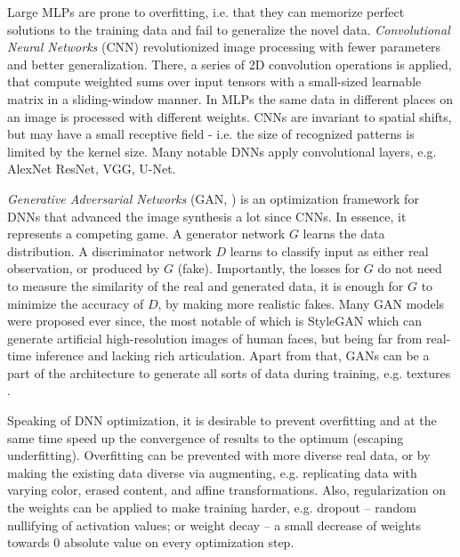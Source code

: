 Large MLPs are prone to overfitting, i.e. that they can memorize perfect solutions to the training data and fail to generalize the novel data. \textit{Convolutional Neural Networks} (CNN) revolutionized \cite{aux:cnn98, dnn:alexnet12} image processing with fewer parameters and better generalization. There, a series of 2D convolution operations is applied, that compute weighted sums over input tensors with a small-sized learnable matrix in a sliding-window manner. In MLPs the same data in different places on an image is processed with different weights. CNNs are invariant to spatial shifts, but may have a small receptive field - i.e. the size of recognized patterns is limited by the kernel size. Many notable DNNs apply convolutional layers, e.g. AlexNet\cite{dnn:alexnet12} ResNet\cite{dnn:resnet16}, VGG\cite{dnn:vgg14}, U-Net\cite{dnn:unet15}.

\textit{Generative Adversarial Networks} (GAN,  \cite{dnn:gan14}) is an optimization framework for DNNs that advanced the image synthesis a lot since CNNs. In essence, it represents a competing game. A generator network $G$ learns the data distribution. A discriminator network $D$ learns to classify input as either real observation, or produced by $G$ (fake). Importantly, the losses for $G$ do not need to measure the similarity of the real and generated data, it is enough for $G$ to minimize the accuracy of $D$, by making more realistic fakes. Many GAN models were proposed \cite{survey:gans:18} ever since, the most notable of which is StyleGAN \cite{dnn:stylegan-v1-19,dnn:stylegan-v2-20,dnn:stylegan-v3-21} which can generate artificial high-resolution images of human faces, but being far from real-time inference and lacking rich articulation. Apart from that, GANs can be a part of the architecture to generate all sorts of data during training, e.g. textures \cite{dnn:stylepeople21, dnn:hyperstyle21}.

Speaking of DNN optimization, it is desirable to prevent overfitting and at the same time speed up the convergence of results to the optimum (escaping underfitting). Overfitting can be prevented with more diverse real data, or by making the existing data diverse via augmenting, e.g. replicating data with varying color, erased content, and affine transformations. Also, regularization on the weights can be applied to make training harder, e.g. dropout\cite{aux:dropout14} -- random nullifying of activation values; or weight decay\cite{aux:adamw17} -- a small decrease of weights towards 0 absolute value on every optimization step.

